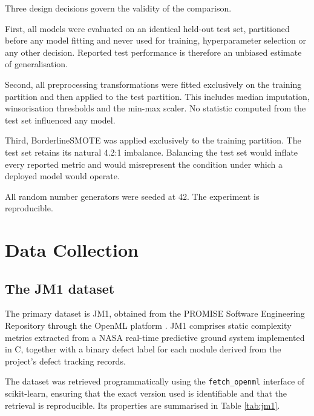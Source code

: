 \documentclass[12pt,a4paper,oneside]{report}
\begin{document}
Three design decisions govern the validity of the comparison.

First, all models were evaluated on an identical held-out test set, partitioned before any model fitting and never used for training, hyperparameter selection or any other decision. Reported test performance is therefore an unbiased estimate of generalisation.

Second, all preprocessing transformations were fitted exclusively on the training partition and then applied to the test partition. This includes median imputation, winsorisation thresholds and the min-max scaler. No statistic computed from the test set influenced any model.

Third, BorderlineSMOTE was applied exclusively to the training partition. The test set retains its natural 4.2:1 imbalance. Balancing the test set would inflate every reported metric and would misrepresent the condition under which a deployed model would operate.

All random number generators were seeded at 42. The experiment is reproducible.

\section{Data Collection}

\subsection{The JM1 dataset}

The primary dataset is JM1, obtained from the PROMISE Software Engineering Repository \cite{promise} through the OpenML platform \cite{openml}. JM1 comprises static complexity metrics extracted from a NASA real-time predictive ground system implemented in C, together with a binary defect label for each module derived from the project's defect tracking records.

The dataset was retrieved programmatically using the \texttt{fetch\_openml} interface of scikit-learn, ensuring that the exact version used is identifiable and that the retrieval is reproducible. Its properties are summarised in Table \ref{tab:jm1}.
\end{document}
